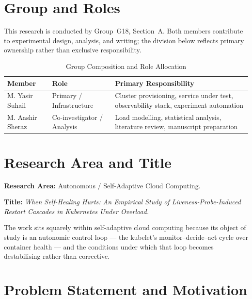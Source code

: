 \documentclass[conference]{IEEEtran}
\begin{document}
\section{Group and Roles}

This research is conducted by Group~G18, Section~A. Both members
contribute to experimental design, analysis, and writing; the division
below reflects primary ownership rather than exclusive responsibility.

\begin{table}[h]
\centering
\caption{Group Composition and Role Allocation}
\label{tab:roles}
\footnotesize
\begin{tabular}{@{}p{}p{}p{}@{}}
\toprule
\textbf{Member} & \textbf{Role} & \textbf{Primary Responsibility} \\
\midrule
M. Yasir Suhail & Primary /
Infrastructure & Cluster provisioning, service under test,
observability stack, experiment automation \\
\addlinespace
M. Aashir Sheraz & Co-investigator /
Analysis & Load modelling, statistical analysis, literature
review, manuscript preparation \\
\bottomrule
\end{tabular}
\end{table}

\section{Research Area and Title}

\textbf{Research Area:} Autonomous / Self-Adaptive Cloud Computing.

\textbf{Title:} \emph{When Self-Healing Hurts: An Empirical Study of
Liveness-Probe-Induced Restart Cascades in Kubernetes Under Overload.}

The work sits squarely within self-adaptive cloud computing because
its object of study is an autonomic control loop --- the kubelet's
monitor--decide--act cycle over container health --- and the
conditions under which that loop becomes destabilising rather than
corrective.

\section{Problem Statement and Motivation}
\end{document}

